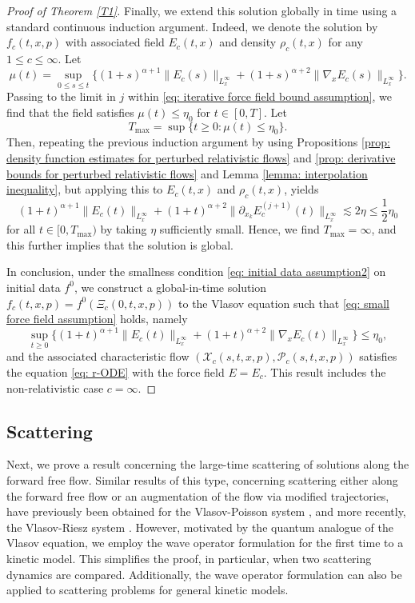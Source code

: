 \documentclass[reqno, 11pt, letterpaper]{amsart}
\theoremstyle{remark}
\numberwithin{equation}{section}
\numberwithin{theorem}{section}
\numberwithin{table}{section}
\numberwithin{figure}{section}
\begin{document}
\begin{proof}[Proof of Theorem \ref{T1}]
Finally, we extend this solution globally in time using a standard continuous induction argument. Indeed, we denote the solution by $f_c(t,x,p)$ with associated field $E_c(t,x)$ and density $\rho_c(t,x)$
for any $1 \leq c \leq \infty$.
Let 
$$\mu(t) = \sup_{0 \leq s \leq t}\Big\{(1+s)^{\alpha+1}\|E_c(s)\|_{L_x^\infty}+(1+s)^{\alpha+2}\|\nabla_x E_c(s)\|_{L_x^\infty}\Big\}.$$
Passing to the limit in $j$ within \eqref{eq: iterative force field bound assumption}, we find that the field satisfies
$\mu(t) \leq \eta_0$
for $t \in [0,T]$.
Let
$$T_\mathrm{max} = \sup\{t \geq 0: \mu(t) \leq \eta_0 \}.$$
Then, repeating the previous induction argument by using Propositions \ref{prop: density function estimates for perturbed relativistic flows} and \ref{prop: derivative bounds for perturbed relativistic flows} and Lemma \ref{lemma: interpolation inequality}, but applying this to $E_c(t,x)$ and $\rho_c(t,x)$, yields
$$
(1+t)^{\alpha+1} \|E_c(t)\|_{L_x^\infty} + (1+t)^{\alpha+2} \|\partial_{x_k} E_c^{(j+1)}(t)\|_{L_x^\infty} \lesssim 2\eta \leq \frac{1}{2} \eta_0$$
for all $t \in [0,T_\mathrm{max})$
by taking $\eta$ sufficiently small.
Hence, we find $T_\mathrm{max} = \infty$, and this further implies that the solution is global.

In conclusion, under the smallness condition \eqref{eq: initial data assumption2} on initial data $f^0$, we construct a global-in-time solution $f_c(t,x,p)=f^0(\Xi_c(0,t, x,p))$ to the Vlasov equation such that \eqref{eq: small force field assumption} holds, namely
$$\sup_{t\geq0}\Big\{(1+t)^{\alpha+1}\|E_c(t)\|_{L_x^\infty}+(1+t)^{\alpha+2}\|\nabla_x E_c(t)\|_{L_x^\infty}\Big\}\leq\eta_0,$$
and the associated characteristic flow $(\mathcal{X}_c(s,t, x,p), \mathcal{P}_c(s,t, x,p))$ satisfies the equation \eqref{eq: r-ODE} with the force field $E=E_c$. This result includes the non-relativistic case $c=\infty$.
\end{proof}

\subsection{Scattering}\label{sec: scattering}
Next, we prove a result concerning the large-time scattering of solutions along the forward free flow. Similar results of this type, concerning scattering either along the forward free flow or an augmentation of the flow via modified trajectories, have previously been obtained for the Vlasov-Poisson system \cite{IPWW22, Pankavich2, Pankavich1, Pankavich3}, and more recently, the Vlasov-Riesz system \cite{HuangKwon}.
%
However, motivated by the quantum analogue of the Vlasov equation, we employ the wave operator formulation for the first time to a kinetic model. This simplifies the proof, in particular, when two scattering dynamics are compared. Additionally, the wave operator formulation can also be applied to scattering problems for general kinetic models.
\end{document}
